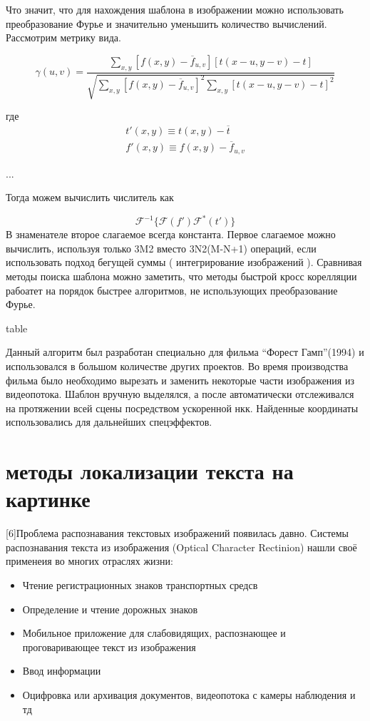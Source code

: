 \documentclass[oneside,final,14pt]{extreport}
\begin{document}
Что значит, что для нахождения шаблона в изображении можно использовать преобразование Фурье и значительно уменьшить количество вычислений. 
Рассмотрим метрику вида.

\begin{equation}
\gamma(u,v)
=
\frac{
\sum_{x,y}
[f(x,y) - \overline{f}_{u,v}]
[t(x-u,y-v)-t]
}
{
\sqrt{
\sum_{x,y}
[f(x,y) - \overline{f}_{u,v}]^2
\sum_{x,y}
[t(x-u,y-v)-t]^2
}
} 
\end{equation}

где
\begin{gather*}
t'(x,y)
\equiv
t(x,y) - \overline{t}
\\
f'(x,y)
\equiv
f(x,y) - \overline{f}_{u,v}
\end{gather*}

...

Тогда можем вычислить числитель как

\begin{equation}
\mathcal{F}^{-1}
\{
\mathcal{F}(f')
\mathcal{F}^*(t')
\}
\end{equation}
В знаменателе второе слагаемое всегда константа. Первое слагаемое можно вычислить, используя только 3M2   вместо 3N2(M-N+1) операций, если использовать подход бегущей суммы ( интегрирование изображений ). 
Сравнивая методы поиска шаблона можно заметить, что методы быстрой кросс корелляции рабоатет на порядок быстрее алгоритмов, не использующих преобразование Фурье. 

table

Данный алгоритм был разработан специально для фильма “Форест Гамп”(1994) и использовался в большом количестве других проектов. Во время производства фильма было необходимо вырезать и заменить некоторые части изображения из видеопотока. Шаблон вручную выделялся, а после автоматически отслеживался на протяжении всей сцены посредством ускоренной нкк. Найденные координаты использовались для дальнейших спецэффектов.

\chapter{методы локализации текста на картинке}
[6]Проблема распознавания текстовых изображений появилась давно. Системы распознавания текста из изображения (Optical Character Rectinion) нашли своё применеия во многих отраслях жизни:

\begin{itemize}[label= $-$, noitemsep]
\item Чтение регистрационных знаков транспортных средсв
\item Определение и чтение дорожных знаков

\item Мобильное приложение для слабовидящих, распознающее и проговаривающее текст из изображения

\item Ввод информации

\item Оцифровка или архивация документов, видеопотока с камеры наблюдения и тд

\end{itemize}
\end{document}
